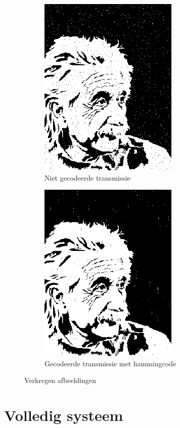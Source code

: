 \documentclass[11pt,a4paper]{article}
\begin{document}
\begin{figure}[h!]
        \centering
\begin{subfigure}[b]{0.35\textwidth}
  		\centering
   		\includegraphics{3_2_7_1.pdf}
  		\caption{Niet gecodeerde transmissie}
  		\label{fig:3_2_7_1}
\end{subfigure}
\begin{subfigure}[b]{0.35\textwidth}
  		\centering
   		\includegraphics{3_2_7_2.pdf}
  		\caption{Gecodeerde transmissie met hammingcode}
  		\label{fig:3_2_7_2}
\end{subfigure}		
  		\caption{Verkregen afbeeldingen}\label{fig:7_verk_afb}
\end{figure}



\section{Volledig systeem}
\end{document}
